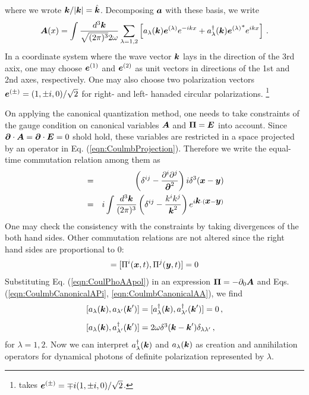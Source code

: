 where we wrote $\mbox{\boldmath $k$} / |\mbox{\boldmath $k$}| = \hat{\mbox{\boldmath $k$}}$.
Decomposing $\mbox{\boldmath $a$}$ with these basis, we write
\begin{eqnarray}
\mbox{\boldmath $A$}(x) = \int \frac{d^3 \mbox{\boldmath $k$}}{\sqrt{(2\pi)^3}2\omega} 
\sum_{\lambda = 1, 2}
\left[
a_\lambda (\mbox{\boldmath $k$}) \mbox{\boldmath $e$}^{(\lambda)} e^{-i k x} 
+ 
a_\lambda^{\dagger}(\mbox{\boldmath $k$}) {\mbox{\boldmath $e$}^{(\lambda)}}^* e^{i k x} 
\right] \,.
\label{eqn:CoulPhoAApol}
\end{eqnarray}
In a coordinate system where the wave vector $\mbox{\boldmath $k$}$ lays in the direction of the
3rd axix,
one may choose $\mbox{\boldmath $e$}^{(1)}$ and $\mbox{\boldmath $e$}^{(2)}$ as unit vectors in directions of
the 1st and 2nd axes, respectively. One may also choose two polarization vectors
$\mbox{\boldmath $e$}^{(\pm)} =  (1, \pm i , 0)/\sqrt{2}$  for right- and left- hanaded circular
polarizations.
\footnote{%
\cite{ref:Lifshitz} takes
$\mbox{\boldmath $e$}^{(\pm)} = \mp i (1, \pm i , 0)/\sqrt{2}$.
}%

On applying the canonical quantization method,
one needs to take constraints of the gauge condition on canonical
variables $\mbox{\boldmath $A$}$ and $\mbox{\boldmath $\Pi$} = \mbox{\boldmath $E$}$ into account.
Since $\mbox{\boldmath $\partial$}\cdot \mbox{\boldmath $A$} = \mbox{\boldmath $\partial$}\cdot \mbox{\boldmath $E$} = 0$ shold
hold, these variables are restricted in a space projected by
an operator in Eq. (\ref{eqn:CoulmbProjection}). Therefore we write
the equal-time commutation relation among them as
\begin{eqnarray}
[ A^i (\bld{x}, t), \Pi^j (\bld{y}, t) ]
&=&
\left(
\delta^{ij}
-
\frac{\partial^i \partial^j}
{\bld{\partial}^2}
\right)
i \delta^3 (\bld{x} - \bld{y})
\nonumber\\
&=&
i \int \frac{d^3 \bld{k}}{(2\pi)^3}
\left(
\delta^{ij}
-
\frac{k^i k^j}{\bld{k}^2}
\right)
e^{i \bld{k} \cdot (\bld{x} - \bld{y})}
\label{eqn:CoulmbCanonicalAPi}
\end{eqnarray}
One may check the consistency with the constraints by taking 
divergences of the both hand sides.
Other commutation relations are not altered since the right hand sides are
proportional to 0:
\begin{eqnarray}
[ A^i (\bld{x}, t), A^j (\bld{y}, t) ]
=
[ \Pi^i (\bld{x}, t), \Pi^j (\bld{y}, t) ]
=
0
\label{eqn:CoulmbCanonicalAA}
\end{eqnarray}
Substituting Eq. (\ref{eqn:CoulPhoAApol}) in an expression
$\mbox{\boldmath $\Pi$} = - \partial_0 \mbox{\boldmath $A$}$ and Eqs. (\ref{eqn:CoulmbCanonicalAPi}, \ref{eqn:CoulmbCanonicalAA}),
we find
\begin{eqnarray}
\begin{array}{l}
[a_\lambda(\bld{k}), a_{\lambda '}(\bld{k}')]
=
[a^\dagger_\lambda(\bld{k}), a^\dagger_{\lambda '}(\bld{k}')]
=0 \,,
\vspace{3mm}
\\
{[}a_\lambda (\bld{k}), a^\dagger_{\lambda '} (\bld{k}'){]}
=
2 \omega \delta^3(\bld{k} - \bld{k}') \delta_{\lambda \lambda'} \,,
\end{array}
\end{eqnarray}
for $\lambda = 1, 2$.
Now we can interpret $a^\dagger_\lambda (\mbox{\boldmath $k$})$ and $a_\lambda (\mbox{\boldmath $k$})$
as creation and annihilation operators for dynamical photons of definite polarization represented by $\lambda$.

